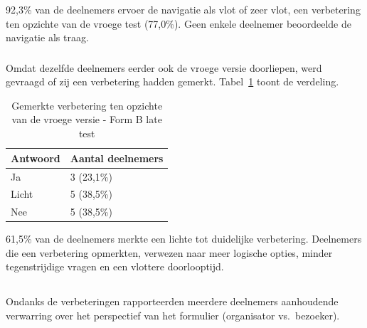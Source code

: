 92,3\% van de deelnemers ervoer de navigatie als vlot of zeer vlot, een verbetering ten opzichte van de vroege test (77,0\%). Geen enkele deelnemer beoordeelde de navigatie als traag.

\subsubsection{}

Omdat dezelfde deelnemers eerder ook de vroege versie doorliepen, werd gevraagd of zij een verbetering hadden gemerkt. Tabel~\ref{tab:laat-formb-verbetering} toont de verdeling.

\begin{table}[h]
  \centering
  \caption[Gemerkte verbetering late test Form B]{Gemerkte verbetering ten opzichte van de vroege versie - Form B late test}
  \label{tab:laat-formb-verbetering}
  \begin{tabular}{ll}
    \hline
    \textbf{Antwoord} & \textbf{Aantal deelnemers} \\
    \hline
    Ja    & 3 (23,1\%) \\
    Licht & 5 (38,5\%) \\
    Nee   & 5 (38,5\%) \\
    \hline
  \end{tabular}
\end{table}

61,5\% van de deelnemers merkte een lichte tot duidelijke verbetering. Deelnemers die een verbetering opmerkten, verwezen naar meer logische opties, minder tegenstrijdige vragen en een vlottere doorlooptijd.

\subsection{}

\subsubsection{}

Ondanks de verbeteringen rapporteerden meerdere deelnemers aanhoudende verwarring over het perspectief van het formulier (organisator vs.\ bezoeker).

